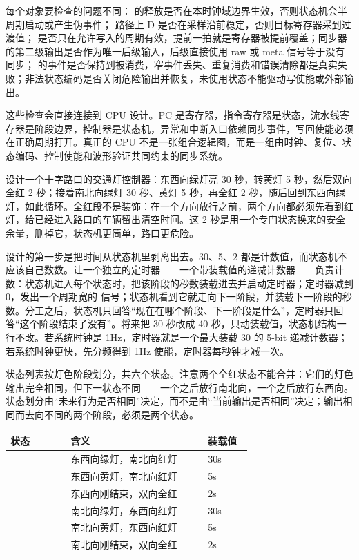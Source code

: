 每个对象要检查的问题不同： 的释放是否在本时钟域边界生效，否则状态机会半周期启动或产生伪事件； 路径上 D 是否在采样沿前稳定，否则目标寄存器采到过渡值； 是否只在允许写入的周期有效，提前一拍就是寄存器被提前覆盖；同步器的第二级输出是否作为唯一后级输入，后级直接使用 raw 或 meta 信号等于没有同步； 的事件是否保持到被消费，窄事件丢失、重复消费和错误清除都是真实失败；非法状态编码是否关闭危险输出并恢复，未使用状态不能驱动写使能或外部输出。

这些检查会直接连接到 CPU 设计。PC 是寄存器，指令寄存器是状态，流水线寄存器是阶段边界，控制器是状态机，异常和中断入口依赖同步事件，写回使能必须在正确周期打开。真正的 CPU 不是一张组合逻辑图，而是一组由时钟、复位、状态编码、控制使能和波形验证共同约束的同步系统。


设计一个十字路口的交通灯控制器：东西向绿灯亮 30 秒，转黄灯 5 秒，然后双向全红 2 秒；接着南北向绿灯 30 秒、黄灯 5 秒，再全红 2 秒，随后回到东西向绿灯，如此循环。全红段不是装饰：在一个方向放行之前，两个方向都必须先看到红灯，给已经进入路口的车辆留出清空时间。这 2 秒是用一个专门状态换来的安全余量，删掉它，状态机更简单，路口更危险。

设计的第一步是把时间从状态机里剥离出去。30、5、2 都是计数值，而状态机不应该自己数数。让一个独立的定时器——一个带装载值的递减计数器——负责计数：状态机进入每个状态时，把该阶段的秒数装载进去并启动定时器；定时器减到 0，发出一个周期宽的  信号；状态机看到它就走向下一阶段，并装载下一阶段的秒数。分工之后，状态机只回答“现在在哪个阶段、下一阶段是什么”，定时器只回答“这个阶段结束了没有”。将来把 30 秒改成 40 秒，只动装载值，状态机结构一行不改。若系统时钟是 1Hz，定时器就是一个最大装载 30 的 5-bit 递减计数器；若系统时钟更快，先分频得到 1Hz 使能，定时器每秒钟才减一次。

状态列表按灯色阶段划分，共六个状态。注意两个全红状态不能合并：它们的灯色输出完全相同，但下一状态不同——一个之后放行南北向，一个之后放行东西向。状态划分由“未来行为是否相同”决定，而不是由“当前输出是否相同”决定；输出相同而去向不同的两个阶段，必须是两个状态。

\begin{longtable}{L{0.22\linewidth}L{0.5\linewidth}L{0.16\linewidth}}
\toprule
状态 & 含义 & 装载值 \\
\midrule
{} & 东西向绿灯，南北向红灯 & 30s \\\tablerowrule
{} & 东西向黄灯，南北向红灯 & 5s \\\tablerowrule
{} & 东西向刚结束，双向全红 & 2s \\\tablerowrule
{} & 南北向绿灯，东西向红灯 & 30s \\\tablerowrule
{} & 南北向黄灯，东西向红灯 & 5s \\\tablerowrule
{} & 南北向刚结束，双向全红 & 2s \\
\bottomrule
\end{longtable}

